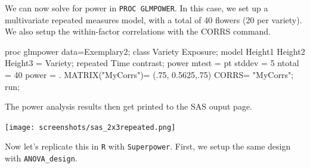 \documentclass[
]{book}
\newenvironment{Shaded}{\begin{snugshade}}{\end{snugshade}}
\newcommand{\DecValTok}[1]{\textcolor[rgb]{0.00,0.00,0.81}{#1}}
\newcommand{\FloatTok}[1]{\textcolor[rgb]{0.00,0.00,0.81}{#1}}
\newcommand{\FunctionTok}[1]{\textcolor[rgb]{0.00,0.00,0.00}{#1}}
\newcommand{\NormalTok}[1]{#1}
\newcommand{\OtherTok}[1]{\textcolor[rgb]{0.56,0.35,0.01}{#1}}
\newcommand{\StringTok}[1]{\textcolor[rgb]{0.31,0.60,0.02}{#1}}
\begin{document}
We can now solve for power in \texttt{PROC\ GLMPOWER}. In this case, we set up a multivariate repeated measures model, with a total of 40 flowers (20 per variety). We also setup the within-factor correlations with the CORRS command.

\begin{Shaded}
\begin{Highlighting}[]
\NormalTok{proc glmpower data}\OtherTok{=}\NormalTok{Exemplary2;}
\NormalTok{class Variety Exposure;}
\NormalTok{model Height1 Height2 Height3 }\OtherTok{=}\NormalTok{ Variety;}
\NormalTok{repeated Time contrast;}
\NormalTok{power}
\NormalTok{mtest }\OtherTok{=}\NormalTok{ pt}
\NormalTok{stddev }\OtherTok{=} \DecValTok{5}
\NormalTok{ntotal }\OtherTok{=} \DecValTok{40}
\NormalTok{power }\OtherTok{=}\NormalTok{ .}
\FunctionTok{MATRIX}\NormalTok{(}\StringTok{"MyCorrs"}\NormalTok{)}\OtherTok{=}\NormalTok{ (.}\DecValTok{75}\NormalTok{,}
                    \FloatTok{0.5625}\NormalTok{,.}\DecValTok{75}\NormalTok{)}
\NormalTok{CORRS}\OtherTok{=} \StringTok{"MyCorrs"}\NormalTok{;}
\NormalTok{run;}
\end{Highlighting}
\end{Shaded}

The power analysis results then get printed to the SAS ouput page.

\texttt{[image: screenshots/sas\_2x3repeated.png]}

Now let's replicate this in \texttt{R} with \texttt{Superpower}. First, we setup the same design with \texttt{ANOVA\_design}.
\end{document}
